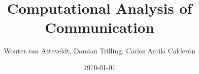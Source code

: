 \documentclass[a4paper,12pt]{book}
\begin{document}
\author{Wouter van Atteveldt, Damian Trilling, Carlos Arcila Calder\'on}
\title{Computational Analysis of Communication}
\date{\today}

\frontmatter
\maketitle
\tableofcontents

\mainmatter

\setcounter{chapter}{1}



\setcounter{chapter}{5}


\backmatter
\end{document}
